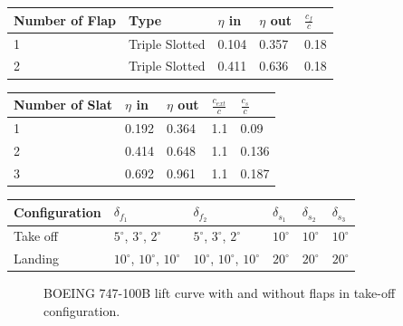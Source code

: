 \begin{center}
	\begin{tabular}{| l | l | l | l | l |}
		\hline
		 Number of Flap & Type &  $\eta$ in &  $\eta$ out &   $\frac{c_{f}}{c} $  \\ \hline
				1  & Triple Slotted&  0.104  & 0.357  & 0.18 \\ \hline 
		         2& Triple Slotted & 0.411 & 0.636 &0.18\\ \hline 
		\hline
	\end{tabular}
\end{center}


\begin{center}
	\begin{tabular}{| l | l | l | l | l |}
		\hline
		 Number of Slat &  $\eta$ in &  $\eta$ out &   $\frac{c_{ext}}{c} $ & $\frac{c_{s}}{c} $   \\ \hline
				1 & 0.192  & 0.364  &1.1 & 0.09\\ \hline 
		         2 & 0.414  & 0.648  &1.1& 0.136\\ \hline 
		         3 & 0.692  & 0.961  &1.1& 0.187\\ \hline 
		\hline
	\end{tabular}
\end{center}


\begin{center}
	\begin{tabular}{ | l | l | l | l | l | l |}
		\hline
		Configuration &  $\delta_{f_1}$ & $\delta_{f_2}$ &  $\delta_{s_1}$ & $\delta_{s_2}$& $\delta_{s_3}$ \\ \hline
		Take off &  $5^{\circ}$, $3^{\circ}$, $2^{\circ}$ & $5^{\circ}$, $3^{\circ}$, $2^{\circ}$ & $10^{\circ}$ &  $10^{\circ}$ &  $10^{\circ}$\\ \hline
		Landing  &    $10^{\circ}$, $10^{\circ}$, $10^{\circ}$ & $10^{\circ}$, $10^{\circ}$, $10^{\circ}$ & $20^{\circ}$ &  $20^{\circ}$ &  $20^{\circ}$\\ \hline
		\hline
	\end{tabular}
\end{center}


\begin{figure}[H]
\centering

\caption{BOEING 747-100B  lift curve with and without flaps in take-off configuration.}
\label{fig:clATR}
\end{figure}

